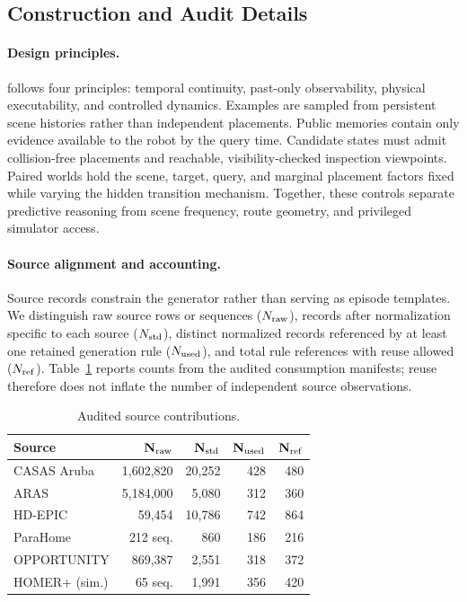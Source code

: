 \subsection{Construction and Audit Details}
\label{app:benchmark-construction}

\paragraph{Design principles.}
\evolvingworldbench{} follows four principles: temporal continuity, past-only observability,
physical executability, and controlled dynamics. Examples are sampled from
persistent scene histories rather than independent placements. Public memories
contain only evidence available to the robot by the query time. Candidate states
must admit collision-free placements and reachable, visibility-checked inspection
viewpoints. Paired worlds hold the scene, target, query, and marginal placement
factors fixed while varying the hidden transition mechanism. Together, these
controls separate predictive reasoning from scene frequency, route geometry,
and privileged simulator access.

\paragraph{Source alignment and accounting.}
Source records constrain the generator rather than serving as episode templates.
We distinguish raw source rows or sequences ($N_{\rm raw}$), records after
normalization specific to each source ($N_{\rm std}$), distinct normalized records
referenced by at least one retained generation rule ($N_{\rm used}$), and total
rule references with reuse allowed ($N_{\rm ref}$). Table~\ref{tab:source-accounting}
reports counts from the audited consumption manifests; reuse therefore does not
inflate the number of independent source observations.

\begin{table}
\vspace{-0.8\baselineskip}
\caption{Audited source contributions.}
\label{tab:source-accounting}
\centering
\scriptsize
\setlength{\tabcolsep}{1.25pt}
\begin{tabular}{lrrrr}
\toprule
\textbf{Source} & $\mathbf{N_{\rm raw}}$ & $\mathbf{N_{\rm std}}$ & $\mathbf{N_{\rm used}}$ & $\mathbf{N_{\rm ref}}$ \\
\midrule
CASAS Aruba & 1,602,820 & 20,252 & 428 & 480 \\
ARAS & 5,184,000 & 5,080 & 312 & 360 \\
HD-EPIC & 59,454 & 10,786 & 742 & 864 \\
ParaHome & 212 seq. & 860 & 186 & 216 \\
OPPORTUNITY & 869,387 & 2,551 & 318 & 372 \\
HOMER+ (sim.) & 65 seq. & 1,991 & 356 & 420 \\
\bottomrule
\end{tabular}
\end{table}


